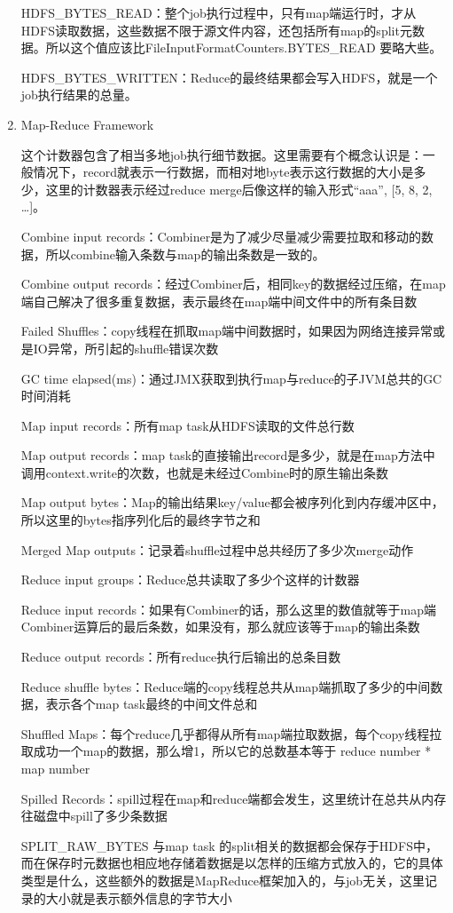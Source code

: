 \begin{enumerate}
HDFS\_BYTES\_READ：整个job执行过程中，只有map端运行时，才从HDFS读取数据，这些数据不限于源文件内容，还包括所有map的split元数据。所以这个值应该比FileInputFormatCounters.BYTES\_READ 要略大些。 

HDFS\_BYTES\_WRITTEN：Reduce的最终结果都会写入HDFS，就是一个job执行结果的总量。 


\item Map-Reduce Framework

这个计数器包含了相当多地job执行细节数据。这里需要有个概念认识是：一般情况下，record就表示一行数据，而相对地byte表示这行数据的大小是多少，这里的计数器表示经过reduce merge后像这样的输入形式{“aaa”, [5, 8, 2, …]}。 

Combine input records：Combiner是为了减少尽量减少需要拉取和移动的数据，所以combine输入条数与map的输出条数是一致的。 

Combine output records：经过Combiner后，相同key的数据经过压缩，在map端自己解决了很多重复数据，表示最终在map端中间文件中的所有条目数 

Failed Shuffles：copy线程在抓取map端中间数据时，如果因为网络连接异常或是IO异常，所引起的shuffle错误次数 

GC time elapsed(ms)：通过JMX获取到执行map与reduce的子JVM总共的GC时间消耗 

Map input records：所有map task从HDFS读取的文件总行数 

Map output records：map task的直接输出record是多少，就是在map方法中调用context.write的次数，也就是未经过Combine时的原生输出条数 

Map output bytes：Map的输出结果key/value都会被序列化到内存缓冲区中，所以这里的bytes指序列化后的最终字节之和 

Merged Map outputs：记录着shuffle过程中总共经历了多少次merge动作 

Reduce input groups：Reduce总共读取了多少个这样的计数器 

Reduce input records：如果有Combiner的话，那么这里的数值就等于map端Combiner运算后的最后条数，如果没有，那么就应该等于map的输出条数 

Reduce output records：所有reduce执行后输出的总条目数 

Reduce shuffle bytes：Reduce端的copy线程总共从map端抓取了多少的中间数据，表示各个map task最终的中间文件总和 

Shuffled Maps：每个reduce几乎都得从所有map端拉取数据，每个copy线程拉取成功一个map的数据，那么增1，所以它的总数基本等于 reduce number * map number 

Spilled Records：spill过程在map和reduce端都会发生，这里统计在总共从内存往磁盘中spill了多少条数据 

SPLIT\_RAW\_BYTES 
与map task 的split相关的数据都会保存于HDFS中，而在保存时元数据也相应地存储着数据是以怎样的压缩方式放入的，它的具体类型是什么，这些额外的数据是MapReduce框架加入的，与job无关，这里记录的大小就是表示额外信息的字节大小 

\end{enumerate}
	
